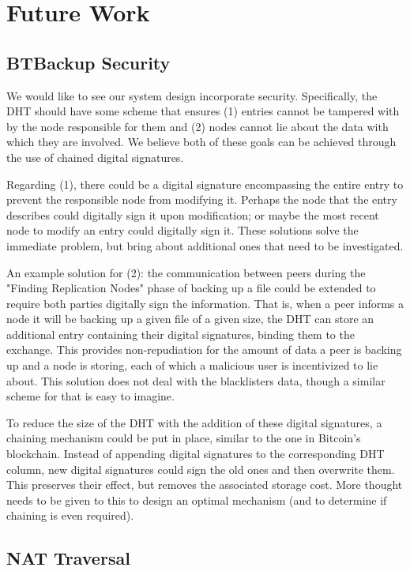 \documentclass[12pt]{report}
\begin{document}
\section{Future Work}

\subsection{BTBackup Security} \label{subsec:BTBackupSecurity}

We would like to see our system design incorporate security. Specifically, the DHT should have some scheme that ensures (1) entries cannot be tampered with by the node responsible for them and (2) nodes cannot lie about the data with which they are involved. We believe both of these goals can be achieved through the use of chained digital signatures.

Regarding (1), there could be a digital signature encompassing the entire entry to prevent the responsible node from modifying it. Perhaps the node that the entry describes could digitally sign it upon modification; or maybe the most recent node to modify an entry could digitally sign it. These solutions solve the immediate problem, but bring about additional ones that need to be investigated.

An example solution for (2): the communication between peers during the "Finding Replication Nodes" phase of backing up a file could be extended to require both parties digitally sign the information. That is, when a peer informs a node it will be backing up a given file of a given size, the DHT can store an additional entry containing their digital signatures, binding them to the exchange. This provides non-repudiation for the amount of data a peer is backing up and a node is storing, each of which a malicious user is incentivized to lie about. This solution does not deal with the blacklisters data, though a similar scheme for that is easy to imagine.

To reduce the size of the DHT with the addition of these digital signatures, a chaining mechanism could be put in place, similar to the one in Bitcoin's blockchain. Instead of appending digital signatures to the corresponding DHT column, new digital signatures could sign the old ones and then overwrite them. This preserves their effect, but removes the associated storage cost. More thought needs to be given to this to design an optimal mechanism (and to determine if chaining is even required).


\subsection{NAT Traversal}
\end{document}
